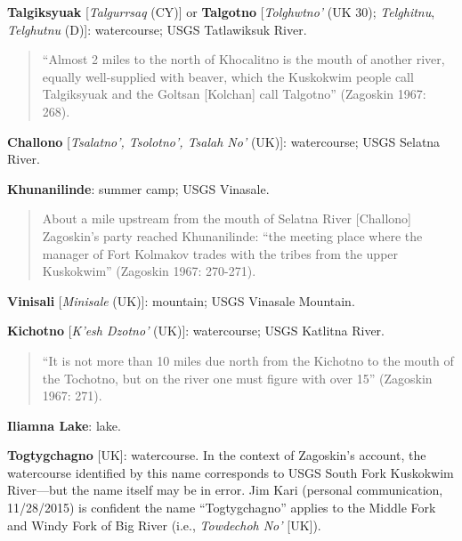 \begin{hang}
\textbf{Talgiksyuak} [\textit{Talgurrsaq} (CY)] or \textbf{Talgotno} [\textit{Tolghwtno’} (UK 30); \textit{Telghitnu}, \textit{Telghutnu} (D)]: watercourse; USGS Tatlawiksuk River.



\begin{quote}“Almost 2 miles to the north of Khocalitno is the mouth of another river, equally well-supplied with beaver, which the Kuskokwim people call Talgiksyuak and the Goltsan [Kolchan] call Talgotno” (Zagoskin 1967: 268).
\end{quote}



\textbf{Challono} [\textit{Tsalatno’, Tsolotno’, Tsalah No’} (UK)]: watercourse; USGS Selatna River.



\textbf{Khunanilinde}: summer camp; USGS Vinasale.



\begin{quote}About a mile upstream from the mouth of Selatna River [Challono] Zagoskin’s party reached Khunanilinde: “the meeting place where the manager of Fort Kolmakov trades with the tribes from the upper Kuskokwim” (Zagoskin 1967: 270-271).
\end{quote}



\textbf{Vinisali} [\textit{Minisale} (UK)]: mountain; USGS Vinasale Mountain.



\textbf{Kichotno} [\textit{K’esh Dzotno’} (UK)]: watercourse; USGS Katlitna River.



\begin{quote}“It is not more than 10 miles due north from the Kichotno to the mouth of the Tochotno, but on the river one must figure with over 15” (Zagoskin 1967: 271).
\end{quote}



\textbf{Iliamna Lake}: lake.



\textbf{Togtygchagno} [UK]: watercourse. In the context of Zagoskin’s account, the watercourse identified by this name corresponds to USGS South Fork Kuskokwim River—but the name itself may be in error. Jim Kari (personal communication, 11/28/2015) is confident the name “Togtygchagno” applies to the Middle Fork and Windy Fork of Big River (i.e., \textit{Towdechoh No’} [UK]).




\end{hang}

